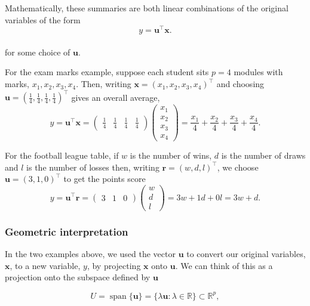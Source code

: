 \documentclass[]{book}
\theoremstyle{definition}
\theoremstyle{definition}
\theoremstyle{definition}
\theoremstyle{remark}
\begin{document}
Mathematically, these summaries
are both linear combinations of the
original variables of the form
\[y = \mathbf u^\top \mathbf x.\]\\
for some choice of \(\mathbf u\).

For the exam marks example, suppose each student sits \(p=4\) modules
with marks, \(x_1,x_2,x_3,x_4\). Then, writing \(\mathbf x=(x_1, x_2 , x_3, x_4)^\top\) and choosing \(\mathbf u= \left(\frac{1}{4}, \frac{1}{4}, \frac{1}{4}, \frac{1}{4} \right)^\top\)
gives an overall average,
\[ y =\mathbf u^\top \mathbf x= \begin{pmatrix} \frac{1}{4} & \frac{1}{4} & \frac{1}{4} & \frac{1}{4} \end{pmatrix} \begin{pmatrix} x_1 \\ x_2 \\ x_3 \\ x_4 \end{pmatrix} = \frac{x_1}{4} + \frac{x_2}{4} + \frac{x_3}{4} + \frac{x_4}{4}.\]

For the football league table, if \(w\) is the number of wins, \(d\) is the number of draws and \(l\) is the number of losses then, writing
\({\mathbf r}=(w,d,l)^\top\), we choose \(\mathbf u= \left(3,1,0 \right)^\top\) to get the points score
\[ y = \mathbf u^\top {\mathbf r}=\begin{pmatrix} 3 & 1 & 0 \end{pmatrix} \begin{pmatrix} w \\ d \\ l \end{pmatrix} = 3w + 1d + 0l=3w+d.\]

\hypertarget{geometric-interpretation}{%
\subsubsection*{Geometric interpretation}\label{geometric-interpretation}}

In the two examples above, we used the vector \(\mathbf u\) to convert our original variables, \(\mathbf x\),
to a new variable, \(y\), by projecting \(\mathbf x\) onto \(\mathbf u\).
We can think of this as a projection onto the subspace defined by \(\mathbf u\)

\[U = \operatorname{span}\{\mathbf u\} = \{\lambda \mathbf u: \lambda \in \mathbb{R}\}\subset \mathbb{R}^p,\]
\end{document}
